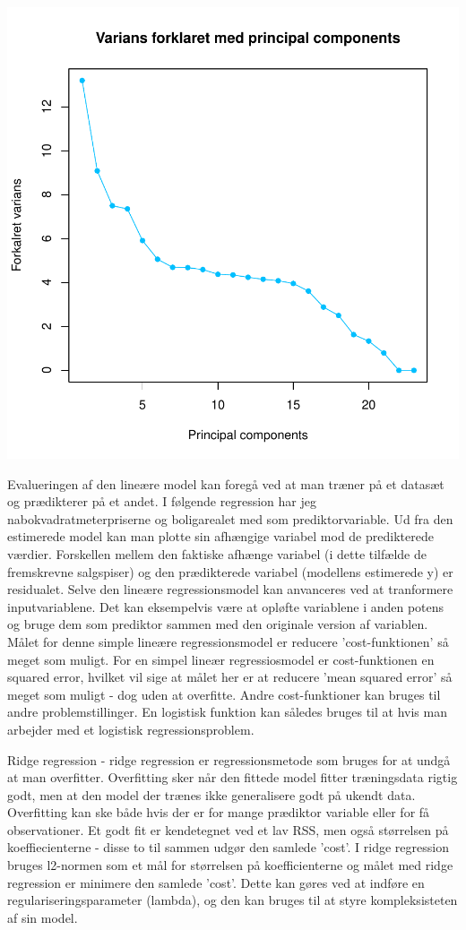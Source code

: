 \documentclass{report}
\begin{document}
\includegraphics{rapport_latex-008}

Evalueringen af den lineære model kan foregå ved at man træner på et datasæt og prædikterer på et andet. I følgende regression har jeg nabokvadratmeterpriserne og boligarealet med som prediktorvariable. 
Ud fra den estimerede model kan man plotte sin afhængige variabel mod de predikterede værdier.
Forskellen mellem den faktiske afhænge variabel (i dette tilfælde de fremskrevne salgspiser) og den prædikterede variabel (modellens estimerede y) er residualet.
Selve den lineære regressionsmodel kan anvanceres ved at tranformere inputvariablene. Det kan eksempelvis være at opløfte variablene i anden potens og bruge dem som prediktor sammen med den originale version af variablen.
Målet for denne simple lineære regressionsmodel er reducere 'cost-funktionen' så meget som muligt. For en simpel lineær regressiosmodel er cost-funktionen en squared error, hvilket vil sige at målet her er at reducere 'mean squared error' så meget som muligt - dog uden at overfitte. 
Andre cost-funktioner kan bruges til andre problemstillinger. En logistisk funktion kan således bruges til at hvis man arbejder med et logistisk regressionsproblem. 

Ridge regression - ridge regression er regressionsmetode som bruges for at undgå at man overfitter. Overfitting sker når den fittede model fitter træningsdata rigtig godt, men at den model der trænes ikke generalisere godt på ukendt data. Overfitting kan ske både hvis der er for mange prædiktor variable eller for få observationer. 
Et godt fit er kendetegnet ved et lav RSS, men også størrelsen på koeffiecienterne - disse to til sammen udgør den samlede 'cost'. I ridge regression bruges l2-normen som et mål for størrelsen på koefficienterne og målet med ridge regression er minimere den samlede 'cost'.
Dette kan gøres ved at indføre en regulariseringsparameter (lambda), og den kan bruges til at styre kompleksisteten af sin model. 
\end{document}
